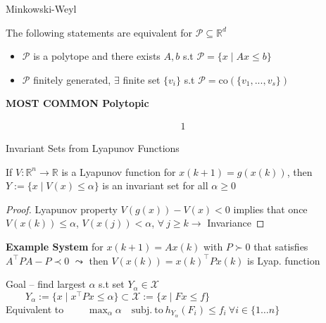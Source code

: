 \begin{theorem}{Minkowski-Weyl}

	The following statements are equivalent
	for $\mathcal{P}\subseteq \mathbb{R}^d$
	\begin{itemize}[leftmargin=1em]
		\item $\mathcal{P}$ is a polytope and there exists
		      $A, b$ s.t $\mathcal{P} = \{x \mid Ax \leq b\}$
		\item $\mathcal{P}$ finitely generated,
		      $\exists$ finite set $\{v_i\}$ s.t
		      $\mathcal{P}=\text{co}(\{v_1,...,v_s\})$
	\end{itemize}
\end{theorem}


\begin{sstTitleBox}[ForestGreen]{\textbf{\large
			MOST COMMON Polytopic
		}
	}


	\[\begin{aligned}
			1
		\end{aligned}\]

\end{sstTitleBox}

\begin{lemma}{Invariant Sets from Lyapunov Functions}

	If $V:\mathbb{R}^n \to \mathbb{R}$ is a Lyapunov function
	for $x(k+1) = g(x(k))$, then
	$Y := \{x \mid V(x) \leq \alpha\}$
	is an invariant set for all $\alpha \geq 0$

	\begin{proof}
		Lyapunov property $V(g(x)) - V(x) < 0$
		implies that once $V(x(k))\leq \alpha$,
		$V(x(j))<\alpha$,
		$\forall\ j\ge k \rightarrow$ Invariance
	\end{proof}

	\textbf{Example System} for $x(k+1) = Ax(k)$ with $P\succ 0$ that satisfies $A^\top P A - P \prec 0$ $\leadsto$ then $V(x(k)) = x(k)^\top P x(k)$ is Lyap. function

	Goal -- find largest $\alpha$ s.t set $Y_\alpha \in \mathcal{X}$ \\
	$\qquad Y_\alpha := \{x \mid x^\top P x \leq \alpha\}\subset \mathcal{X} := \{x \mid Fx\leq f\}$ \\
	Equivalent to $\qquad \max_\alpha \alpha \quad \mathrm{subj.\ to}\ h_{Y_\alpha}(F_i) \leq f_i \ \forall i \in \{1\dots n\}$
\end{lemma}

